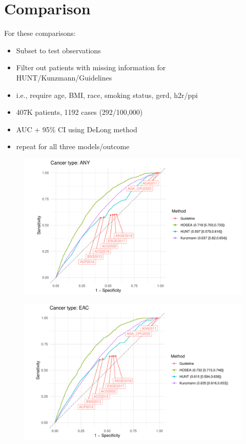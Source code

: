 \documentclass[12pt]{article}
\begin{document}
\section*{Comparison}


For these comparisons:
\begin{itemize}
\item Subset to test observations
\item Filter out patients with missing information for HUNT/Kunzmann/Guidelines
\item i.e., require age, BMI, race, smoking status, gerd, h2r/ppi
\item 407K patients, 1192 cases (292/100,000)
\item AUC + 95\% CI using DeLong method
\item repeat for all three models/outcome
\end{itemize}

\begin{figure}[h]
\centering
\includegraphics[width=1.0\textwidth]{figures/comparison_ANY.pdf}
\end{figure}

\begin{figure}[h]
\centering
\includegraphics[width=1.0\textwidth]{figures/comparison_EAC.pdf}
\end{figure}
\end{document}

